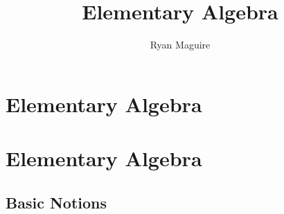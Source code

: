 \documentclass[crop=false,class=book,oneside]{standalone}
\begin{document}
    \newif\ifmathcourseselementaryalgebra
    \ifx\ifmathcourses\undefined
        \title{Elementary Algebra}
        \author{Ryan Maguire}
        \date{\vspace{-5ex}}
        \maketitle
        \tableofcontents
        \chapter*{Elementary Algebra}
        \setcounter{chapter}{1}
    \else
        \chapter{Elementary Algebra}
    \fi
    \section{Basic Notions}
\end{document}
